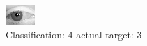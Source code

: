 \begin{figure}[h!]
\begin{center}
\includegraphics[width=0.60\columnwidth]{figures/ID2823_class_4_target_3.png}
\end{center}
\caption{ Classification: 4 actual target: 3}
\label{fig:ID2823_class_4_target_3}
\end{figure}
